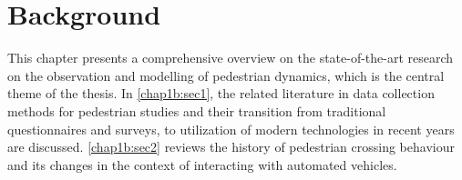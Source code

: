 \chapter{Background}
\label{chap1b}
This chapter presents a comprehensive overview on the state-of-the-art research on the observation and modelling of pedestrian dynamics, which is the central theme of the thesis. In \cref{chap1b:sec1}, the related literature in data collection methods for pedestrian studies and their transition from traditional questionnaires and surveys, to utilization of modern technologies in recent years are discussed. \cref{chap1b:sec2} reviews the history of pedestrian crossing behaviour and its changes in the context of interacting with automated vehicles. 

